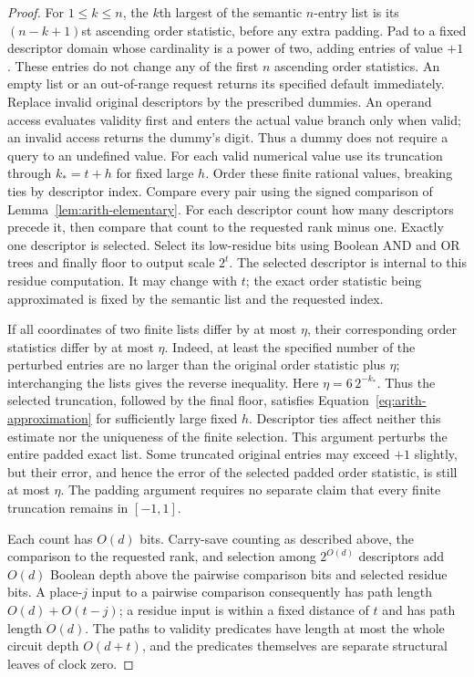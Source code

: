 \documentclass[11pt]{article}
\numberwithin{equation}{section}
\theoremstyle{definition}
\theoremstyle{remark}
\begin{document}
\begin{proof}
For $1\le k\le n$, the $k$th largest of the semantic $n$-entry list
is its $(n-k+1)$st ascending order statistic, before any extra padding.
Pad to a fixed descriptor domain whose cardinality is a power of
two, adding entries of value $+1$.  These entries do not change
any of the first $n$ ascending order statistics.  An empty list or
an out-of-range request returns its specified default immediately.
Replace invalid original descriptors by the prescribed dummies.
An operand access evaluates validity first and enters the actual
value branch only when valid; an invalid access returns the dummy's
digit.  Thus a dummy does not require a query to an undefined value.
For each valid numerical value use its truncation through
${k_*}=t+h$ for fixed large $h$.  Order these finite rational values,
breaking ties by descriptor index.  Compare every pair using the
signed comparison of Lemma~\ref{lem:arith-elementary}.  For each
descriptor count how many descriptors precede it, then compare
that count to the requested rank minus one.  Exactly one
descriptor is selected.  Select its low-residue bits using Boolean
AND and OR trees and finally floor to output scale $2^t$.
The selected descriptor is internal to this residue computation.  It
may change with $t$; the exact order statistic being approximated is
fixed by the semantic list and the requested index.

If all coordinates of two finite lists differ by at most $\eta$,
their corresponding order statistics differ by at most $\eta$.
Indeed, at least the specified number of the perturbed entries
are no larger than the original order statistic plus $\eta$;
interchanging the lists gives the reverse inequality.  Here
$\eta=6\,2^{-{k_*}}$.  Thus the selected truncation, followed by the
final floor, satisfies Equation~\eqref{eq:arith-approximation}
for sufficiently large fixed $h$.  Descriptor ties affect neither
this estimate nor the uniqueness of the finite selection.
This argument perturbs the entire padded exact list.  Some truncated
original entries may exceed $+1$ slightly, but their error, and hence
the error of the selected padded order statistic, is still at most
$\eta$.  The padding argument requires no separate claim that every
finite truncation remains in $[-1,1]$.

Each count has $O(d)$ bits.  Carry-save counting as described
above, the comparison to the requested rank, and selection among
$2^{O(d)}$ descriptors add $O(d)$ Boolean depth above the
pairwise comparison bits and selected residue bits.  A
place-$j$ input to a pairwise comparison consequently has path
length $O(d)+O(t-j)$; a residue input is within a fixed distance
of $t$ and has path length $O(d)$.  The paths to validity predicates
have length at most the whole circuit depth $O(d+t)$, and the
predicates themselves are separate structural leaves of clock zero.


\end{proof}
\end{document}
